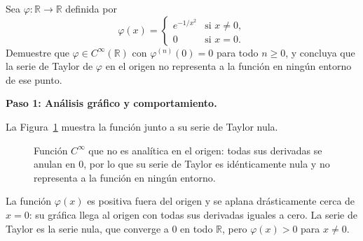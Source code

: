 \begin{example}
Sea $\varphi\colon\mathbb{R}\to\mathbb{R}$ definida por
\[
    \varphi(x) =
    \begin{cases}
        e^{-1/x^2} & \text{si } x \neq 0, \\
        0           & \text{si } x = 0.
    \end{cases}
\]
Demuestre que $\varphi \in C^\infty(\mathbb{R})$ con
$\varphi^{(n)}(0) = 0$ para todo $n \geq 0$, y concluya que la
serie de Taylor de $\varphi$ en el origen no representa a la función
en ningún entorno de ese punto.
\begin{myproof}
\textbf{Paso 1: Análisis gráfico y comportamiento.}

La Figura~\ref{fig:ssf_suave_no_analitica} muestra la función junto a su serie de Taylor nula.

\begin{figure}[H]
\centering
{}
\caption{Función $C^\infty$ que no es analítica en el origen: todas sus derivadas se anulan en $0$, por lo que su serie de Taylor es idénticamente nula y no representa a la función en ningún entorno.}
\label{fig:ssf_suave_no_analitica}
\end{figure}

La función $\varphi(x)$ es positiva fuera del origen y se aplana
drásticamente cerca de $x=0$: su gráfica llega al origen con todas
sus derivadas iguales a cero. La serie de Taylor es la serie nula,
que converge a $0$ en todo $\mathbb{R}$, pero $\varphi(x) > 0$ para
$x \neq 0$.


\end{myproof}
\end{example}
